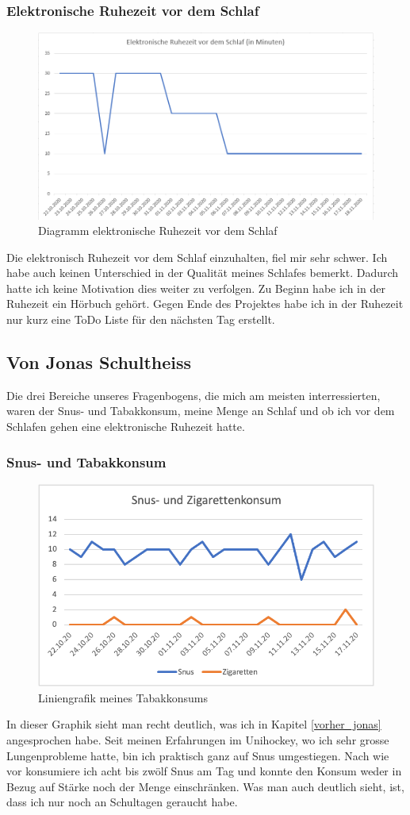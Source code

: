 \subsubsection{Elektronische Ruhezeit vor dem Schlaf}
\begin{figure}[H]
  \centering
  \includegraphics[width=0.7\linewidth]{./images/dario_ruhezeit.PNG}
  \caption{Diagramm elektronische Ruhezeit vor dem Schlaf}
\end{figure}
Die elektronisch Ruhezeit vor dem Schlaf einzuhalten, fiel mir sehr schwer.
\newline
Ich habe auch keinen Unterschied in der Qualität meines Schlafes bemerkt. Dadurch hatte ich keine Motivation dies weiter zu verfolgen.
\newline
Zu Beginn habe ich in der Ruhezeit ein Hörbuch gehört. Gegen Ende des Projektes habe ich in der Ruhezeit nur kurz eine ToDo Liste für den nächsten Tag erstellt.
\subsection{Von Jonas Schultheiss}
\authortoc{\jonas}{\subsectionident}
Die drei Bereiche unseres Fragenbogens, die mich am meisten interressierten, waren der Snus- und Tabakkonsum, meine Menge an Schlaf und ob ich vor dem Schlafen gehen eine elektronische Ruhezeit hatte.
\subsubsection{Snus- und Tabakkonsum}
\begin{figure}[!ht]
  \centering
  \includegraphics[width=0.6\linewidth]{./images/tabak_jonas.png}
  \caption{Liniengrafik meines Tabakkonsums}
  \label{fig:tabak_jonas}
\end{figure}
In dieser Graphik sieht man recht deutlich, was ich in Kapitel \ref{vorher_jonas} angesprochen habe. Seit meinen Erfahrungen im Unihockey, wo ich sehr grosse Lungenprobleme hatte, bin ich praktisch ganz auf Snus umgestiegen. Nach wie vor konsumiere ich acht bis zwölf Snus am Tag und konnte den Konsum weder in Bezug auf Stärke noch der Menge einschränken. Was man auch deutlich sieht, ist, dass ich nur noch an Schultagen geraucht habe.
\pagebreak
